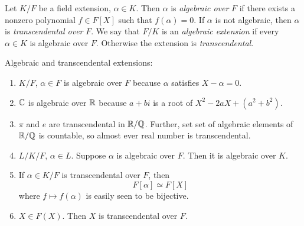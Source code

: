 \begin{dfn}
	Let $K/F$ be a field extension, $\alpha \in K$. Then $\alpha$ is \emph{algebraic over} $F$ if there exists a nonzero polynomial $f \in F[X]$ such that $f(\alpha) = 0$. If $\alpha$ is not algebraic, then $\alpha$ is \emph{transcendental over} $F$. We say that $F/K$ is an \emph{algebraic extension} if every $\alpha\in K$ is algebraic over $F$. Otherwise the extension is \emph{transcendental}. 
\end{dfn}

\begin{eg}
	Algebraic and transcendental extensions:
	\begin{enumerate}
		\item $K / F$, $\alpha \in F$ is algebraic over $F$ because $\alpha$ satisfies $X - \alpha = 0$.
		\item $\mathbb{C}$ is algebraic over $\mathbb{R}$ because $a + bi$ is a root of $X^2 - 2 a X + (a^2 + b^2)$.
		\item $\pi$ and $e$ are transcendental in $\mathbb{R} / \mathbb{Q}$. Further, set set of algebraic elements of $\mathbb{R} / \mathbb{Q}$ is countable, so almost ever real number is transcendental.
		\item $L / K / F$,  $\alpha \in L$. Suppose $\alpha$ is algebraic over $F$. Then it is algebraic over $K$.
		\item If $\alpha \in K / F$ is transcendental over $F$, then
		\[
			F[\alpha] \simeq F[X]
		\]
		where $f \mapsto f(\alpha)$ is easily seen to be bijective.
		\item $X \in F(X)$. Then $X$ is transcendental over $F$.
	\end{enumerate}
\end{eg}

